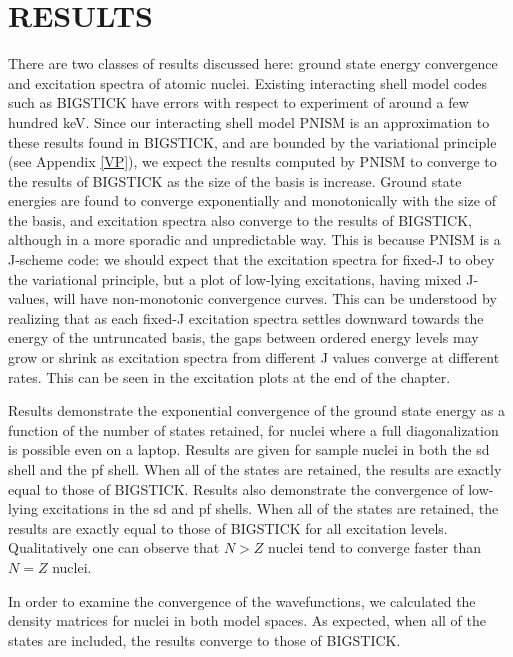 \chapter{RESULTS}
\label{chap:results}

There are two classes of results discussed here: ground state energy convergence
and excitation spectra of atomic nuclei. Existing interacting shell
model codes such as BIGSTICK have errors with respect to experiment of around
a few hundred keV. Since our interacting shell model PNISM is an approximation to these results
found in BIGSTICK, and are bounded by the variational principle (see Appendix \ref{VP}),
we expect the results computed by PNISM to converge to the results of BIGSTICK
as the size of the basis is increase. Ground state energies are found to 
converge exponentially and monotonically with the size of the basis, and excitation 
spectra also converge to the results of BIGSTICK, although in a more sporadic
and unpredictable way. This is because PNISM is a J-scheme code: we should expect
that the excitation spectra for fixed-J to obey the variational principle, but a
plot of low-lying excitations, having mixed J-values, will have non-monotonic
convergence curves. This can be understood by realizing that as each fixed-J
excitation spectra settles downward towards the energy of the untruncated basis, 
the gaps between ordered energy levels may grow or shrink as excitation spectra from different 
J values converge at different rates. This can be seen in the excitation plots at
the end of the chapter. 

Results demonstrate the exponential convergence of the ground 
state energy as a function of the number of states retained, for nuclei 
where a full diagonalization is possible even on a laptop. Results are given
for sample nuclei in both the sd shell and the pf shell. When all of the states
are retained, the results are exactly equal to those of BIGSTICK.
Results also demonstrate the convergence of low-lying excitations in the
sd and pf shells. When all of the states are retained, the results are exactly 
equal to those of BIGSTICK for all excitation levels. Qualitatively one can observe that $N>Z$ nuclei tend
to converge faster than $N=Z$ nuclei.

In order to examine the convergence of the wavefunctions, we calculated
the density matrices for nuclei in both model spaces. As expected, when all 
of the states are included, the results converge to those of BIGSTICK. 

